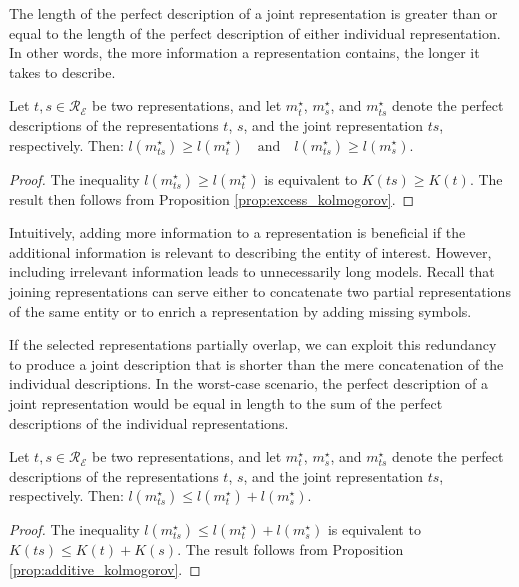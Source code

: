 The length of the perfect description of a joint representation is greater than or equal to the length of the perfect description of either individual representation. In other words, the more information a representation contains, the longer it takes to describe.

\begin{proposition}
\label{prop:joint_length}
Let $t,s \in \mathcal{R}_\mathcal{E}$ be two representations, and let $m_{t}^{\star}$, $m_{s}^{\star}$, and $m_{ts}^{\star}$ denote the perfect descriptions of the representations $t$, $s$, and the joint representation $ts$, respectively. Then: $l \left( m_{ts}^{\star} \right) \geq l \left( m_{t}^{\star} \right) \quad \text{and} \quad l \left( m_{ts}^{\star} \right) \geq l \left( m_{s}^{\star} \right).$
\end{proposition}
\begin{proof}
The inequality $l \left( m_{ts}^{\star} \right) \geq l \left( m_{t}^{\star} \right)$ is equivalent to $K(ts) \geq K(t)$. The result then follows from Proposition \ref{prop:excess_kolmogorov}.
\end{proof}

Intuitively, adding more information to a representation is beneficial if the additional information is relevant to describing the entity of interest. However, including irrelevant information leads to unnecessarily long models. Recall that joining representations can serve either to concatenate two partial representations of the same entity or to enrich a representation by adding missing symbols.

If the selected representations partially overlap, we can exploit this redundancy to produce a joint description that is shorter than the mere concatenation of the individual descriptions. In the worst-case scenario, the perfect description of a joint representation would be equal in length to the sum of the perfect descriptions of the individual representations.

\begin{proposition}
\label{prop:joint_sum}
Let $t, s \in \mathcal{R}_\mathcal{E}$ be two representations, and let $m_{t}^{\star}$, $m_{s}^{\star}$, and $m_{ts}^{\star}$ denote the perfect descriptions of the representations $t$, $s$, and the joint representation $ts$, respectively. Then: $l \left( m_{ts}^{\star} \right) \leq l \left( m_{t}^{\star} \right) + l \left( m_{s}^{\star} \right).$
\end{proposition}
\begin{proof}
The inequality $l \left( m_{ts}^{\star} \right) \leq l \left( m_{t}^{\star} \right) + l \left( m_{s}^{\star} \right)$ is equivalent to $K(ts) \leq K(t) + K(s)$. The result follows from Proposition \ref{prop:additive_kolmogorov}.
\end{proof}

